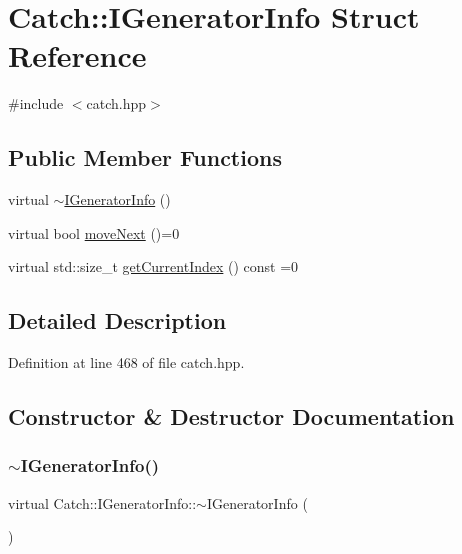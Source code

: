 \hypertarget{struct_catch_1_1_i_generator_info}{}\section{Catch\+:\+:I\+Generator\+Info Struct Reference}
\label{struct_catch_1_1_i_generator_info}


{\ttfamily \#include $<$catch.\+hpp$>$}

\subsection*{Public Member Functions}
\begin{DoxyCompactItemize}
\item 
virtual \hyperlink{struct_catch_1_1_i_generator_info_a9266aa62993298510c2a8b5948abb8e6}{$\sim$\+I\+Generator\+Info} ()
\item 
virtual bool \hyperlink{struct_catch_1_1_i_generator_info_a2b86711ca7009903edfe27ed62b515ef}{move\+Next} ()=0
\item 
virtual std\+::size\+\_\+t \hyperlink{struct_catch_1_1_i_generator_info_a6a0dca712d31f6849fd9447b1344673a}{get\+Current\+Index} () const =0
\end{DoxyCompactItemize}


\subsection{Detailed Description}


Definition at line 468 of file catch.\+hpp.



\subsection{Constructor \& Destructor Documentation}
\hypertarget{struct_catch_1_1_i_generator_info_a9266aa62993298510c2a8b5948abb8e6}{}\label{struct_catch_1_1_i_generator_info_a9266aa62993298510c2a8b5948abb8e6} 
\subsubsection{\texorpdfstring{$\sim$\+I\+Generator\+Info()}{~IGeneratorInfo()}}
{\footnotesize\ttfamily virtual Catch\+::\+I\+Generator\+Info\+::$\sim$\+I\+Generator\+Info (\begin{DoxyParamCaption}{ }\end{DoxyParamCaption})\hspace{0.3cm}{\ttfamily [virtual]}}



